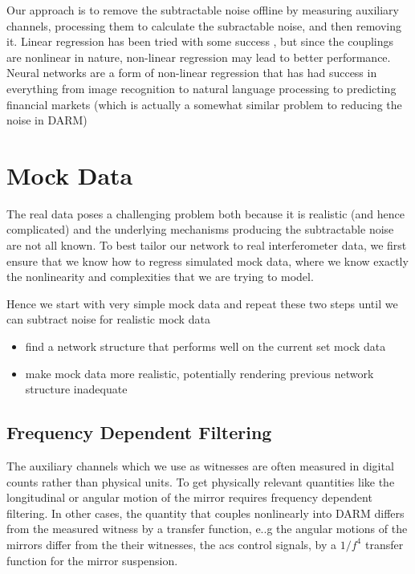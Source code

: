 \begin{refsection}
Our approach is to remove the subtractable noise offline by measuring auxiliary channels, processing them to calculate the subractable noise, and then removing it. Linear regression has been tried with some success \cite{lin_reg}, but since the couplings are nonlinear in nature, non-linear regression may lead to better performance. Neural networks are a form of non-linear regression that has had success in everything from image recognition \cite{10.1007/978-981-15-3020-3_23} to natural language processing \cite{FATHI2018229} to predicting financial markets \cite{siaminamini2018forecasting} (which is actually a somewhat similar problem to reducing the noise in DARM)

\section{Mock Data}

The real data poses a challenging problem both because it is realistic (and hence complicated) and the underlying mechanisms producing the subtractable noise are not all known. To best tailor our network to real interferometer data, we first ensure that we know how to regress simulated mock data, where we know exactly the nonlinearity and complexities that we are trying to model. 

Hence we start with very simple mock data and repeat these two steps until we can subtract noise for realistic mock data
\begin{itemize}
\item find a network structure that performs well on the current set mock data
\item make mock data more realistic, potentially rendering previous network structure inadequate
\end{itemize}

\subsection{Frequency Dependent Filtering}
The auxiliary channels which we use as witnesses are often measured in digital counts rather than physical units. To get physically relevant quantities like the longitudinal or angular motion of the mirror requires frequency dependent filtering. In other cases, the quantity that couples nonlinearly into DARM differs from the measured witness by a transfer function, e..g the angular motions of the mirrors differ from the their witnesses, the acs control signals, by a $1/f^4$ transfer function for the mirror suspension. 


\end{refsection}
